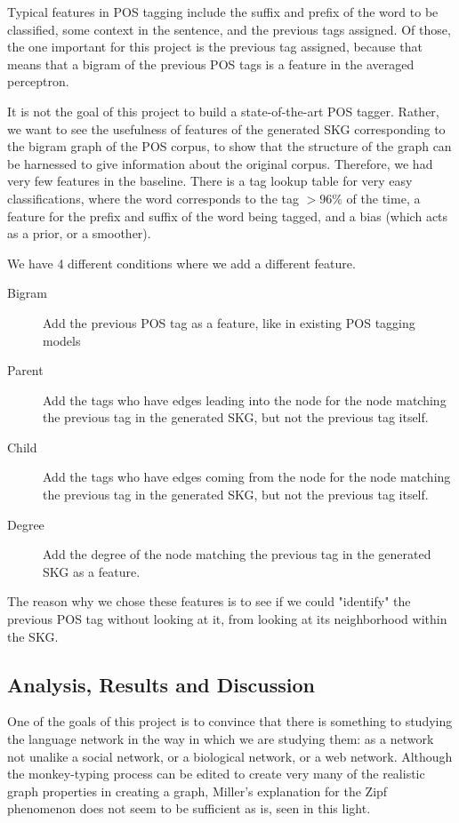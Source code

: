 \documentclass[12pt]{article}
\begin{document}
Typical features in POS tagging include the suffix and prefix of the word to be classified, some context in the sentence, and the previous tags assigned. Of those, the one important for this project is the previous tag assigned, because that means that a bigram of the previous POS tags is a feature in the averaged perceptron. %

It is not the goal of this project to build a state-of-the-art POS tagger. Rather, we want to see the usefulness of features of the generated SKG corresponding to the bigram graph of the POS corpus, to show that the structure of the graph can be harnessed to give information about the original corpus. Therefore, we had very few features in the baseline. There is a tag lookup table for very easy classifications, where the word corresponds to the tag $>96\%$ of the time, a feature for the prefix and suffix of the word being tagged, and a bias (which acts as a prior, or a smoother).

We have 4 different conditions where we add a different feature.

\begin{description}
  \item[Bigram] Add the previous POS tag as a feature, like in existing POS tagging models
  \item[Parent] Add the tags who have edges leading into the node for the node matching the previous tag in the generated SKG, but not the previous tag itself.
  \item[Child] Add the tags who have edges coming from the node for the node matching the previous tag in the generated SKG, but not the previous tag itself.
  \item[Degree] Add the degree of the node matching the previous tag in the generated SKG as a feature.
\end{description}

The reason why we chose these features is to see if we could "identify" the previous POS tag without looking at it, from looking at its neighborhood within the SKG.

\subsection*{Analysis, Results and Discussion}

One of the goals of this project is to convince that there is something to studying the language network in the way in which we are studying them: as a network not unalike a social network, or a biological network, or a web network. Although the monkey-typing process can be edited to create very many of the realistic graph properties in creating a graph, Miller's explanation for the Zipf phenomenon does not seem to be sufficient as is, seen in this light.
\end{document}
